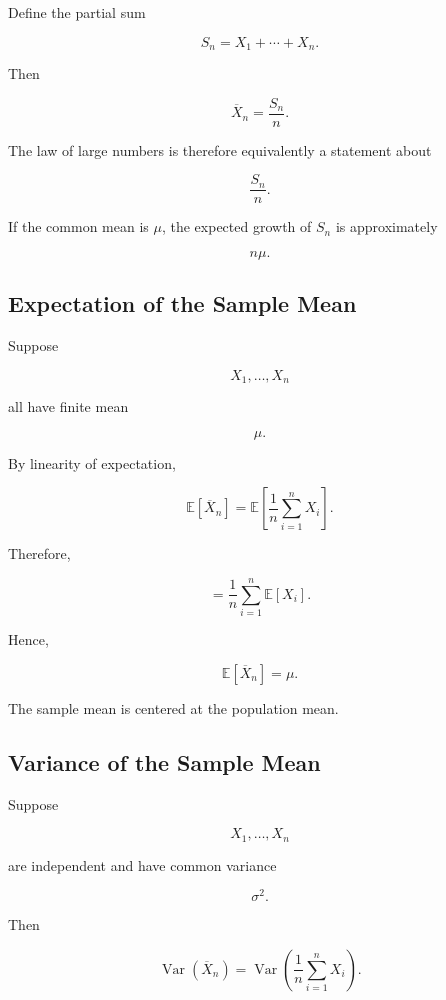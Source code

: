 Define the partial sum

\[
\boxed{
S_n
=
X_1+\cdots+X_n.
}
\]

Then

\[
\boxed{
\overline{X}_n
=
\frac{S_n}{n}.
}
\]

The law of large numbers is therefore equivalently a statement about

\[
\frac{S_n}{n}.
\]

If the common mean is \(\mu\), the expected growth of \(S_n\) is
approximately

\[
n\mu.
\]

\subsection{Expectation of the Sample Mean}
\label{subsec:expectation-sample-mean-lln}

Suppose

\[
X_1,\ldots,X_n
\]

all have finite mean

\[
\mu.
\]

By linearity of expectation,

\[
\mathbb{E}[\overline{X}_n]
=
\mathbb{E}
\left[
\frac1n
\sum_{i=1}^{n}X_i
\right].
\]

Therefore,

\[
=
\frac1n
\sum_{i=1}^{n}\mathbb{E}[X_i].
\]

Hence,

\[
\boxed{
\mathbb{E}[\overline{X}_n]
=
\mu.
}
\]

The sample mean is centered at the population mean.

\subsection{Variance of the Sample Mean}
\label{subsec:variance-sample-mean-lln}

Suppose

\[
X_1,\ldots,X_n
\]

are independent and have common variance

\[
\sigma^2.
\]

Then

\[
\operatorname{Var}(\overline{X}_n)
=
\operatorname{Var}
\left(
\frac1n
\sum_{i=1}^{n}X_i
\right).
\]

